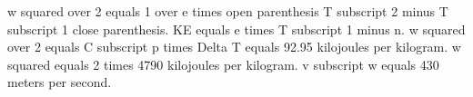 w squared over 2 equals 1 over e times open parenthesis T subscript 2 minus T subscript 1 close parenthesis. KE equals e times T subscript 1 minus n. w squared over 2 equals C subscript p times Delta T equals 92.95 kilojoules per kilogram. w squared equals 2 times 4790 kilojoules per kilogram. v subscript w equals 430 meters per second.